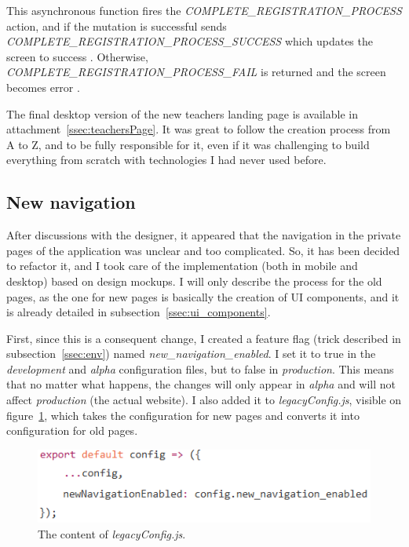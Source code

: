 This asynchronous function fires the \textit{COMPLETE\_REGISTRATION\_PROCESS} action, and if the mutation is successful sends \textit{COMPLETE\_REGISTRATION\_PROCESS\_SUCCESS} which updates the screen to \guillemotleft{} success \guillemotright{}. Otherwise, \textit{COMPLETE\_REGISTRATION\_PROCESS\_FAIL} is returned and the screen becomes \guillemotleft{} error \guillemotright{}.

The final desktop version of the new teachers landing page is available in {\sc attachment}~\ref{ssec:teachersPage}. It was great to follow the creation process from A to Z, and to be fully responsible for it, even if it was challenging to build everything from scratch with technologies I had never used before.

\subsection{New navigation}
\label{ssec:new_nav}

After discussions with the designer, it appeared that the navigation in the private pages of the application was unclear and too complicated. So, it has been decided to refactor it, and I took care of the implementation (both in mobile and desktop) based on design mockups. I will only describe the process for the old pages, as the one for new pages is basically the creation of UI components, and it is already detailed in {\sc subsection}~\ref{ssec:ui_components}.

First, since this is a consequent change, I created a feature flag (trick described in {\sc subsection}~\ref{ssec:env}) named \textit{new\_navigation\_enabled}. I set it to true in the \textit{development} and \textit{alpha} configuration files, but to false in \textit{production}. This means that no matter what happens, the changes will only appear in \textit{alpha} and will not affect \textit{production} (the actual website). I also added it to \textit{legacyConfig.js}, visible on {\sc figure}~\ref{fig:legacyConfig}, which takes the configuration for new pages and converts it into configuration for old pages.

\begin{figure}[H]
    \centering
    \includegraphics[scale=0.8]{figure/legacyConfig.png}
    \caption{The content of \textit{legacyConfig.js}.}
    \label{fig:legacyConfig}
\end{figure}

